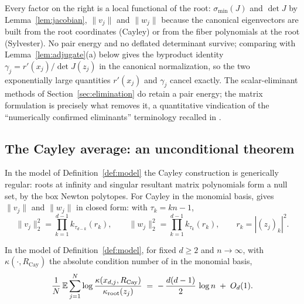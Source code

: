 Every factor on the right is a local functional of the root: $\sigma_{\min}(J)$ and
$\det J$ by Lemma~\ref{lem:jacobian}, $\|v_j\|$ and $\|w_j\|$ because the canonical
eigenvectors are built from the root coordinates (Cayley) or from the fiber polynomials at
the root (Sylvester). No pair energy and no deflated determinant survive; comparing with
Lemma~\ref{lem:adjugate}(a) below gives the byproduct identity
$\gamma_j = r'(x_j)/\det J(z_j)$ in the canonical normalization, so the two exponentially
large quantities $r'(x_j)$ and $\gamma_j$ cancel exactly. The scalar-eliminant methods of
Section~\ref{sec:elimination} do retain a pair energy; the matrix formulation is precisely
what removes it, a quantitative vindication of the ``numerically confirmed eliminants''
terminology recalled in \cite[Sec.~2.2]{noferini2016numerical}.

\subsection{The Cayley average: an unconditional theorem}\label{sec:cayley}

In the model of Definition~\ref{def:model} the Cayley construction is generically regular:
roots at infinity and singular resultant matrix polynomials form a null set, by the box
Newton polytopes. For Cayley in the monomial basis,
\cite[Lem.~3.5]{noferini2016numerical} gives $\|v_j\|$ and $\|w_j\|$ in closed form: with
$\tau_k = kn-1$,
\[
  \|v_j\|_2^2 = \prod_{k=1}^{d-1}k_{\tau_{d-k}}(r_k), \qquad
  \|w_j\|_2^2 = \prod_{k=1}^{d-1}k_{\tau_k}(r_k), \qquad
  r_k = |(z_j)_k|^2.
\]

\begin{theorem}\label{thm:cayley}
  In the model of Definition~\ref{def:model}, for fixed $d\ge2$ and $n\to\infty$, with
  $\kappa(\cdot,R_{\mathrm{Cay}})$ the absolute condition number of
  \cite{noferini2016numerical} in the monomial basis,
  \[
    \frac1N\,\mathbb{E}\sum_{j=1}^N\log\frac{\kappa(x_{d,j},R_{\mathrm{Cay}})}{\kappa_{\mathrm{root}}(z_j)}
    \;=\; -\,\frac{d(d-1)}2\,\log n \;+\; O_d(1).
  \]
\end{theorem}

